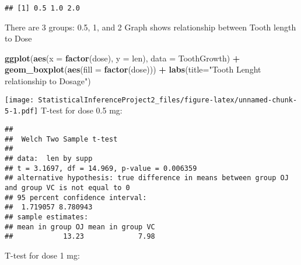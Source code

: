 \documentclass[
]{article}
\newenvironment{Shaded}{\begin{snugshade}}{\end{snugshade}}
\newcommand{\AttributeTok}[1]{\textcolor[rgb]{0.13,0.29,0.53}{#1}}
\newcommand{\DecValTok}[1]{\textcolor[rgb]{0.00,0.00,0.81}{#1}}
\newcommand{\FunctionTok}[1]{\textcolor[rgb]{0.13,0.29,0.53}{\textbf{#1}}}
\newcommand{\NormalTok}[1]{#1}
\newcommand{\SpecialCharTok}[1]{\textcolor[rgb]{0.81,0.36,0.00}{\textbf{#1}}}
\newcommand{\StringTok}[1]{\textcolor[rgb]{0.31,0.60,0.02}{#1}}
\begin{document}
\begin{Shaded}
\end{Shaded}

\begin{verbatim}
## [1] 0.5 1.0 2.0
\end{verbatim}

There are 3 groups: 0.5, 1, and 2 Graph shows relationship between Tooth
length to Dose

\begin{Shaded}
\begin{Highlighting}[]
\FunctionTok{ggplot}\NormalTok{(}\FunctionTok{aes}\NormalTok{(}\AttributeTok{x =} \FunctionTok{factor}\NormalTok{(dose), }\AttributeTok{y =}\NormalTok{ len), }\AttributeTok{data =}\NormalTok{ ToothGrowth) }\SpecialCharTok{+} 
    \FunctionTok{geom\_boxplot}\NormalTok{(}\FunctionTok{aes}\NormalTok{(}\AttributeTok{fill =} \FunctionTok{factor}\NormalTok{(dose))) }\SpecialCharTok{+}
    \FunctionTok{labs}\NormalTok{(}\AttributeTok{title=}\StringTok{"Tooth Lenght relationship to Dosage"}\NormalTok{)}
\end{Highlighting}
\end{Shaded}

\texttt{[image: StatisticalInferenceProject2\_files/figure-latex/unnamed-chunk-5-1.pdf]}
T-test for dose 0.5 mg:

\begin{Shaded}
\end{Shaded}

\begin{verbatim}
## 
##  Welch Two Sample t-test
## 
## data:  len by supp
## t = 3.1697, df = 14.969, p-value = 0.006359
## alternative hypothesis: true difference in means between group OJ and group VC is not equal to 0
## 95 percent confidence interval:
##  1.719057 8.780943
## sample estimates:
## mean in group OJ mean in group VC 
##            13.23             7.98
\end{verbatim}

T-test for dose 1 mg:
\end{document}
